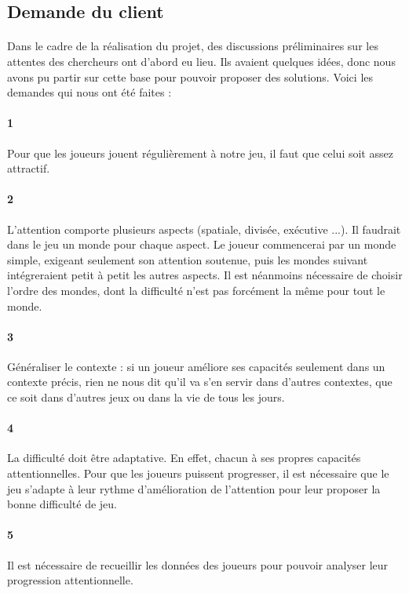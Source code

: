 \subsection{Demande du client}

\paragraph{}Dans le cadre de la réalisation du projet, des discussions préliminaires sur les attentes des chercheurs ont d'abord eu lieu. Ils avaient quelques idées, donc nous avons
pu partir sur cette base pour pouvoir proposer des solutions. Voici les demandes qui nous ont été faites :


\paragraph{1}Pour que les joueurs jouent régulièrement à notre jeu, il faut que celui soit assez attractif.
\paragraph{2}L'attention comporte plusieurs aspects (spatiale, divisée, exécutive ...). Il faudrait dans le jeu un monde pour chaque aspect. Le joueur commencerai par un monde simple,
exigeant seulement son attention soutenue, puis les mondes suivant intégreraient petit à petit les autres aspects. Il est néanmoins nécessaire de choisir l'ordre des mondes, dont la
difficulté n'est pas forcément la même pour tout le monde.
\paragraph{3}Généraliser le contexte : si un joueur améliore ses capacités seulement dans un contexte précis, rien ne nous dit qu'il va s'en servir dans d'autres contextes, que ce soit
dans d'autres jeux ou dans la vie de tous les jours.
\paragraph{4}La difficulté doit être adaptative. En effet, chacun à ses propres capacités attentionnelles. Pour que les joueurs puissent progresser, il est nécessaire que le jeu
s'adapte à leur rythme d'amélioration de l'attention pour leur proposer la bonne difficulté de jeu.
\paragraph{5}Il est nécessaire de recueillir les données des joueurs pour pouvoir analyser leur progression attentionnelle.
